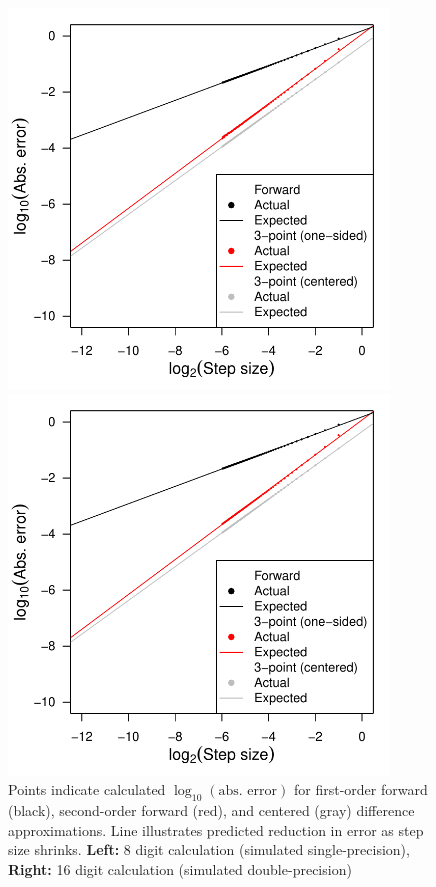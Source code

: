 \documentclass[11pt]{article}
\begin{document}
\begin{figure}[ht!]\centering
\begin{minipage}{0.48\textwidth}
\includegraphics[width=0.9\textwidth]{4_differentiation/step_size_8.pdf}

\end{minipage}
\begin{minipage}{0.48\textwidth}
\includegraphics[width=0.9\textwidth]{4_differentiation/step_size_16.pdf}

\end{minipage}

\caption{Points indicate calculated \(\log_{10}\left(\text{abs. error}\right)\) for first-order forward (black), second-order forward (red), and centered (gray) difference approximations. Line illustrates predicted reduction in error as step size shrinks. \textbf{Left:} 8 digit calculation (simulated single-precision), \textbf{Right:} 16 digit calculation (simulated double-precision)}\label{fig::plots}
\end{figure}
%
\end{document}
